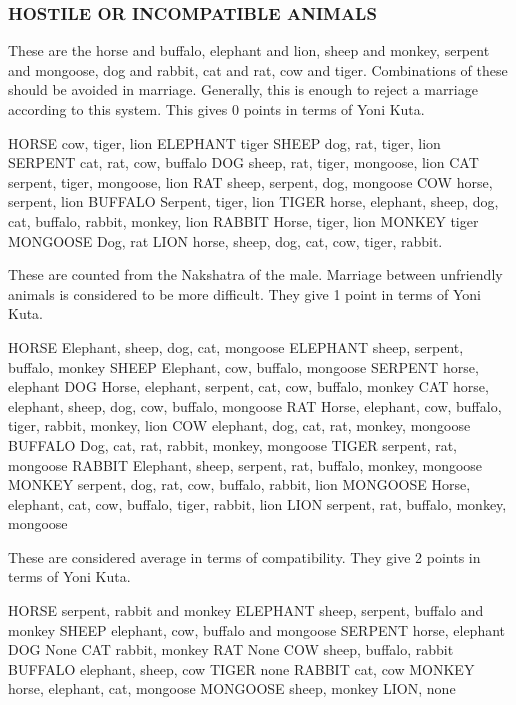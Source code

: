 \subsubsection{HOSTILE OR INCOMPATIBLE ANIMALS}

 

These are the horse and buffalo, elephant and lion, sheep and monkey, serpent and mongoose, dog and rabbit, cat and rat, cow and tiger. Combinations of these should be avoided in marriage. Generally, this is enough to reject a marriage according to this system. This gives 0 points in terms of Yoni Kuta.

 


HORSE	cow, tiger, lion	ELEPHANT	tiger
SHEEP	dog, rat, tiger, lion	SERPENT	cat, rat, cow, buffalo
DOG	sheep, rat, tiger, mongoose, lion	CAT	serpent, tiger, mongoose, lion
RAT	sheep, serpent, dog, mongoose	COW	horse, serpent, lion
BUFFALO	Serpent, tiger, lion	TIGER	horse, elephant, sheep, dog, cat, buffalo, rabbit, monkey, lion
RABBIT	Horse, tiger, lion	MONKEY	tiger
MONGOOSE	Dog, rat	LION	horse, sheep, dog, cat, cow, tiger, rabbit.
 

These are counted from the Nakshatra of the male. Marriage between unfriendly animals is considered to be more difficult. They give 1 point in terms of Yoni Kuta.

 


HORSE	Elephant, sheep, dog, cat, mongoose	ELEPHANT	sheep, serpent, buffalo, monkey
SHEEP	Elephant, cow, buffalo, mongoose	SERPENT	horse, elephant
DOG	Horse, elephant, serpent, cat, cow, buffalo, monkey	CAT	horse, elephant, sheep, dog, cow, buffalo, mongoose
RAT	Horse, elephant, cow, buffalo, tiger, rabbit, monkey, lion	COW	elephant, dog, cat, rat, monkey, mongoose
BUFFALO	Dog, cat, rat, rabbit, monkey, mongoose	TIGER	serpent, rat, mongoose
RABBIT	Elephant, sheep, serpent, rat, buffalo, monkey, mongoose	MONKEY	serpent, dog, rat, cow, buffalo, rabbit, lion
MONGOOSE	Horse, elephant, cat, cow, buffalo, tiger, rabbit, lion	LION	serpent, rat, buffalo, monkey, mongoose
 

These are considered average in terms of compatibility. They give 2 points in terms of Yoni Kuta.

 


HORSE	serpent, rabbit and monkey	ELEPHANT	sheep, serpent, buffalo and monkey
SHEEP	elephant, cow, buffalo and mongoose	SERPENT	horse, elephant
DOG	None	CAT	rabbit, monkey
RAT	None	COW	sheep, buffalo, rabbit
BUFFALO	elephant, sheep, cow	TIGER	none
RABBIT	cat, cow	MONKEY	horse, elephant, cat, mongoose
MONGOOSE	sheep, monkey	LION,	none
 


